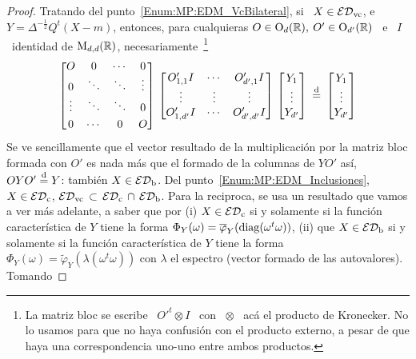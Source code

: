 \begin{proof}
  Tratando del punto~\ref{Enum:MP:EDM_VcBilateral}, si  \ $X \in \mathcal{ED}_{\mathrm{vc}}$, e \
  $Y  =  \Delta^{-\frac12}  Q^t   (X-m)$,  entonces,  para  cualquieras  $O  \in
  \mathrm{O}_d(\mathbb{R}),  \:  O'  \in  \mathrm{O}_{d'}(\mathbb{R})$  \  e  \  $I$  \  identidad  de
  $\mathrm{M}_{d,d}(\mathbb{R})$, necesariamente~\footnote{La matriz  bloc se escribe \ $O'^t
    \otimes I$ \ con \ $\otimes$ \  ac\'a el producto de Kronecker. No lo usamos
    para que  no haya confusi\'on con el  producto externo, a pesar  de que haya
    una correspondencia uno-uno entre ambos productos.}
  \[
  \begin{bmatrix} O & 0 & \cdots & 0 \\ 0 & \ddots & \ddots & \vdots \\ \vdots &
    \ddots  &  \ddots  & \vspace{1mm}  0\\  0  &  \cdots  & 0  &  O\end{bmatrix}
  \,  \begin{bmatrix} O'_{1,1}  I &  \cdots &  O'_{d',1} I\\  \vdots &  \vdots &
    \vdots\\   O'_{1,d'}    I   &   \cdots   &    O'_{d',d'}   I   \end{bmatrix}
  \, \begin{bmatrix}
    Y_1\\ \vdots\\ Y_{d'} \end{bmatrix} \: \egald \: \begin{bmatrix} Y_1\\ \vdots\\
    Y_{d'} \end{bmatrix}
  \]
  Se  ve sencillamente que  el vector  resultado de  la multiplicaci\'on  por la
  matriz bloc formada con $O'$ es nada m\'as que el formado de la columnas de $Y
  O'$   as\'i,  $O  Y   O'  \stackrel{\mathrm{d}}{=}   Y$:  tambi\'en   $X  \in   \mathcal{ED}_{\mathrm{b}}$.   Del
  punto~\ref{Enum:MP:EDM_Inclusiones},  $X  \in  \mathcal{ED}_{\mathrm{c}}$,  \ie  $\mathcal{ED}_{\mathrm{vc}}  \,
  \subset  \, \mathcal{ED}_{\mathrm{c}}  \, \cap  \,  \mathcal{ED}_{\mathrm{b}}$.  Para  la reciproca,  se usa  un
  resultado que vamos a ver m\'as adelante, a saber que por (i) $X \in \mathcal{ED}_{\mathrm{c}}$
  si  y  solamente  si la  funci\'on  caracter\'istica  de  $Y$ tiene  la  forma
  $\Phi_Y(\omega) =  \overline{\varphi}_Y( \operatorname{diag}( \omega^t \omega)  )$, (ii) que
  $X \in \mathcal{ED}_{\mathrm{b}}$ si y solamente  si la funci\'on caracter\'istica de $Y$ tiene
  la forma  $\Phi_Y(\omega) = \widetilde{\varphi}_Y(\lambda(  \omega^t \omega))$
  con  $\lambda$  el espectro  (vector  formado  de  las autovalores).   Tomando

\end{proof}
